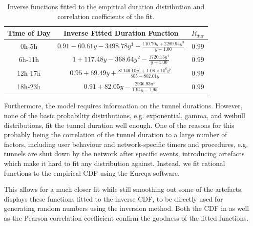\begin{table}
  \centering
  \caption{Inverse functions fitted to the empirical duration distribution and correlation coefficients of the fit.}
  \label{tab:cloud:virtualized_network_functions:measurement_data:evaluation:duration_fits}  
  \begin{tabular}{ccc}
  \toprule
  Time of Day & Inverse Fitted Duration Function & \(R_{dur}\)\\
  \midrule
  0h-5h & $0.91 - 60.61y - 3498.78y^3 - \frac{110.70y + 2289.94y^3}{y - 1.00}$ &  $0.99$ \\
  6h-11h & $1 + 117.48y - 368.64y^2 - \frac{1720.13y^4}{y - 1.00}$ & $0.99$ \\
  12h-17h & $0.95 + 69.49y + \frac{81146.10y^3 + 1.08\times10^6y^5}{805 - 802.01y}$ & $0.99$ \\
  18h-23h & $0.91 + 82.05y - \frac{2936.93y^4}{1.94y - 1.95}$ & $0.99$\\
  \bottomrule
  \end{tabular}
\end{table}

Furthermore, the model requires information on the tunnel durations.
However, none of the basic probability distributions, e.g. exponential, gamma, and weibull distributions, fit the tunnel duration well enough.
One of the reasons for this probably being the correlation of the tunnel duration to a large number of factors, including user behaviour and network-specific timers and procedures, e.g. tunnels are shut down by the network after specific events, introducing artefacts which make it hard to fit any distribution against.
Instead, we fit rational functions to the empirical \gls{CDF} using the Eureqa \cite{Schmidt2009} software.

This allows for a much closer fit while still smoothing out some of the artefacts.
 displays these functions fitted to the inverse \gls{CDF}, to be directly used for generating random numbers using the inversion method.
Both the \gls{CDF} in  as well as the Pearson correlation coefficient confirm the goodness of the fitted functions.

